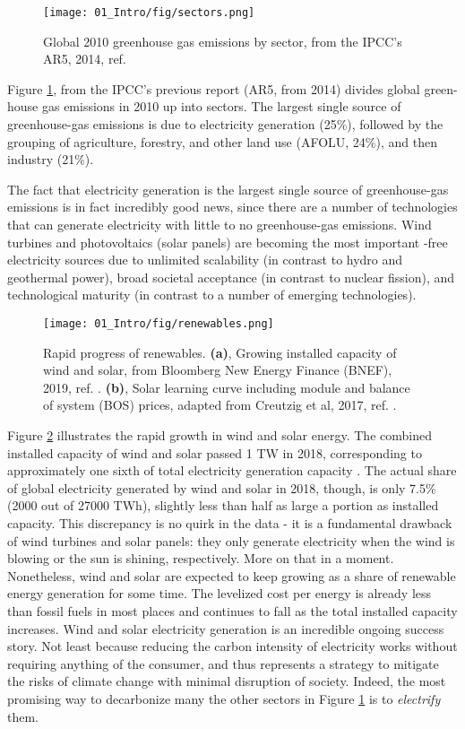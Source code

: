 \begin{figure}[h!]
	\centering
	\texttt{[image: 01\_Intro/fig/sectors.png]}
	\caption{Global 2010 greenhouse gas emissions by sector, from the IPCC's AR5, 2014, ref. \cite{IPCC2014}}
	\label{fig:sectors}
\end{figure}

Figure \ref{fig:sectors}, from the IPCC's previous report (AR5, from 2014)\cite{IPCC2014} divides global green-house gas emissions in 2010 up into sectors. The largest single source of greenhouse-gas emissions is due to electricity generation (25\%), followed by the grouping of agriculture, forestry, and other land use (AFOLU, 24\%), and then industry (21\%). 

The fact that electricity generation is the largest single source of greenhouse-gas emissions is in fact incredibly good news, since there are a number of technologies that can generate electricity with little to no greenhouse-gas emissions. Wind turbines and photovoltaics (solar panels) are becoming the most important -free electricity sources due to unlimited scalability (in contrast to hydro and geothermal power), broad societal acceptance (in contrast to nuclear fission), and technological maturity (in contrast to a number of emerging technologies)\cite{BNEF2018, Creutzig2017}. 
\begin{figure}[h!]
	\centering
	\texttt{[image: 01\_Intro/fig/renewables.png]}
	\caption{Rapid progress of renewables. \textbf{(a)}, Growing installed capacity of wind and solar, from Bloomberg New Energy Finance (BNEF), 2019, ref. . \textbf{(b)}, Solar learning curve including module and balance of system (BOS) prices, adapted from Creutzig et al, 2017, ref. .}
	\label{fig:renewables}
\end{figure}
Figure \ref{fig:renewables} illustrates the rapid growth in wind and solar energy. The combined installed capacity of wind and solar passed 1 TW\cite{BNEF2018} in 2018, corresponding to approximately one sixth of total electricity generation capacity \cite{IRENA2019}. The actual share of global electricity generated by wind and solar in 2018, though, is only 7.5\% (2000 out of 27000 TWh)\cite{Enerdata2019}, slightly less than half as large a portion as installed capacity. This discrepancy is no quirk in the data - it is a fundamental drawback of wind turbines and solar panels: they only generate electricity when the wind is blowing or the sun is shining, respectively. More on that in a moment. Nonetheless, wind and solar are expected to keep growing as a share of renewable energy generation for some time. The levelized cost per energy is already less than fossil fuels in most places and continues to fall as the total installed capacity increases\cite{Bloomberg2016, Creutzig2017}. Wind and solar electricity generation is an incredible ongoing success story. Not least because reducing the carbon intensity of electricity works without requiring anything of the consumer, and thus represents a strategy to mitigate the risks of climate change with minimal disruption of society. Indeed, the most promising way to decarbonize many the other sectors in Figure \ref{fig:sectors} is to \textit{electrify} them. 

